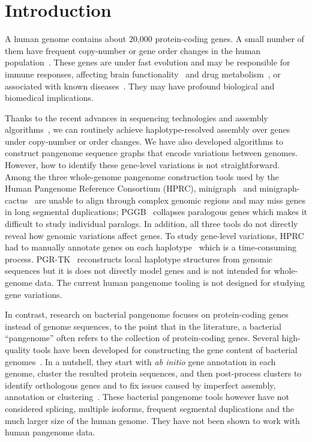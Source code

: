 \documentclass[webpdf,contemporary,large,namedate]{oup-authoring-template}%
\begin{document}
\maketitle

\section{Introduction}
A human genome contains about 20,000 protein-coding genes.
A small number of them have frequent copy-number or gene order changes in the human population~\citep{Sudmant:2010aa,Handsaker:2015ur}.
These genes are under fast evolution
and may be responsible for immune responses,
affecting brain functionality~\citep{Ju:2016aa} and drug metabolism~\citep{Taylor:2020aa},
or associated with known diseases~\citep{Mercuri:2022aa}.
They may have profound biological and biomedical implications.

Thanks to the recent advances in sequencing technologies \citep{Wenger_2019} and assembly algorithms~\citep{Nurk:2020we,Cheng:2021aa,Rautiainen:2023aa},
we can routinely achieve haplotype-resolved assembly over genes under copy-number or order changes.
We have also developed algorithms to construct pangenome sequence graphs that encode variations between genomes.
However, how to identify these gene-level variations is not straightforward.
Among the three whole-genome pangenome construction tools used by the Human Pangenome Reference Consortium (HPRC),
minigraph~\citep{Li:2020aa} and minigraph-cactus~\citep{Hickey:2023aa} are
unable to align through complex genomic regions and may miss genes in long segmental duplications;
PGGB~\citep{Garrison2023.04.05.535718} collapses paralogous genes which makes it difficult to study individual paralogs.
In addition, all three tools do not directly reveal how genomic variations affect genes.
To study gene-level variations, HPRC
had to manually annotate genes on each haplotype~\citep{Liao:2023aa} which is a time-consuming process.
PGR-TK~\citep{Chin:2023aa} reconstructs local haplotype structures from genomic sequences
but it is does not directly model genes and is not intended for whole-genome data.
The current human pangenome tooling is not designed for studying gene variations.

In contrast, research on bacterial pangenome
focuses on protein-coding genes instead of genome sequences, to the point that
in the literature, a bacterial ``pangenome'' often refers to the collection of protein-coding genes.
Several high-quality tools have been developed for constructing the gene content of bacterial genomes~\citep{Page:2015aa,Ding:2018aa,Tonkin-Hill:2020aa,Gautreau:2020aa,Zhou:2020aa}.
In a nutshell, they start with \emph{ab initio} gene annotation in each genome,
cluster the resulted protein sequences,
and then post-process clusters to identify orthologous genes
and to fix issues caused by imperfect assembly, annotation or clustering~\citep{Tonkin-Hill:2023aa}.
These bacterial pangenome tools however have not considered splicing,
multiple isoforms, frequent segmental duplications and the much larger size of the human genome.
They have not been shown to work with human pangenome data.
\end{document}
